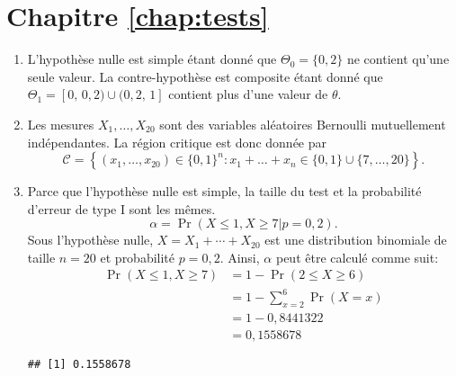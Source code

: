 \section*{Chapitre \ref{chap:tests}}

\begin{solution}{6.1}
\begin{enumerate}
\item L'hypothèse nulle est simple étant donné que $\Theta_0 = \{ 0,2\}$ ne contient qu'une seule valeur. La contre-hypothèse est composite étant donné que $\Theta_1 = [0,\, 0,2) \cup (0,2,\, 1]$ contient plus d'une valeur de $\theta$.

\item Les mesures $X_1, \ldots , X_{20}$ sont des variables aléatoires Bernoulli mutuellement indépendantes. La région critique est donc donnée par
$$
\mathcal{C} = \left\{ (x_1,\dots, x_{20}) \in \{0,1\}^n  :  x_1 + \dots + x_n \in \{ 0,1\} \cup \{7,\dots,20 \}\right \}.
$$

\item Parce que l'hypothèse nulle est simple, la taille du test et la probabilité d'erreur de type I sont les mêmes.
$$
\alpha =\Pr(X  \le 1, X \ge 7  |  p = 0,2).
$$
Sous l'hypothèse nulle, $X = X_1 + \cdots + X_{20}$ est une distribution binomiale de taille $n=20$ et probabilité $p=0,2$. Ainsi, $\alpha$ peut être calculé comme suit:
\begin{align*}
\Pr(X  \le 1, X \ge 7) &= 1 - \Pr(2 \le X \ge 6) \\
&= 1 - \sum_{x=2}^6 \Pr(X=x) \\
&= 1 - 0,8441322 \\
&= 0,1558678
\end{align*}
\begin{knitrout}
\color{fgcolor}\begin{kframe}
\begin{alltt}
\hlstd{(}\hlstd{,}\hlstd{=}\hlstd{,}\hlstd{=}\hlstd{)} \hlopt{+} \hlopt{-}\hlstd{(}\hlstd{,}\hlstd{=}\hlstd{,}\hlstd{=}\hlstd{)}
\end{alltt}
\begin{verbatim}
## [1] 0.1558678
\end{verbatim}
\end{kframe}
\end{knitrout}


\end{enumerate}
\end{solution}
